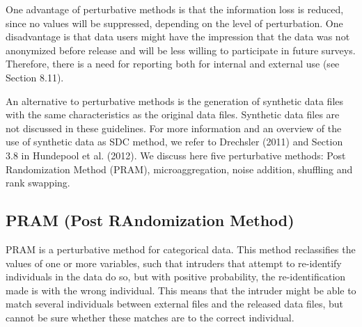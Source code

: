\documentclass[letterpaper,10pt,english]{sphinxmanual}
\begin{document}
One advantage of perturbative methods is that the information loss is
reduced, since no values will be suppressed, depending on the level of
perturbation. One disadvantage is that data users might have the
impression that the data was not anonymized before release and will be
less willing to participate in future surveys. Therefore, there is a
need for reporting both for internal and external use (see Section
8.11).

An alternative to perturbative methods is the generation of synthetic
data files with the same characteristics as the original data files.
Synthetic data files are not discussed in these guidelines. For more
information and an overview of the use of synthetic data as SDC method,
we refer to Drechsler (2011) and Section 3.8 in Hundepool et al. (2012).
We discuss here five perturbative methods: Post Randomization Method
(PRAM), microaggregation, noise addition, shuffling and rank swapping.


\subsection{PRAM (Post RAndomization Method)}
\label{\detokenize{anon_methods:pram-post-randomization-method}}
PRAM is a perturbative method for categorical data. This method
reclassifies the values of one or more variables, such that intruders
that attempt to re-identify individuals in the data do so, but with
positive probability, the re-identification made is with the wrong
individual. This means that the intruder might be able to match several
individuals between external files and the released data files, but
cannot be sure whether these matches are to the correct individual.
\end{document}
